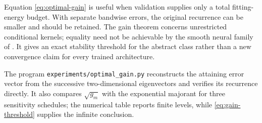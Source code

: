 Equation \eqref{eq:optimal-gain} is useful when validation supplies only a total fitting-energy budget. With separate bandwise errors, the original recurrence can be smaller and should be retained. The gain theorem concerns unrestricted conditional kernels; equality need not be achievable by the smooth neural family of . It gives an exact stability threshold for the abstract class rather than a new convergence claim for every trained architecture.

The program \texttt{experiments/optimal\_gain.py} reconstructs the attaining error vector from the successive two-dimensional eigenvectors and verifies its recurrence directly. It also compares $\sqrt{g_m}$ with the exponential majorant for three sensitivity schedules; the numerical table reports finite levels, while \eqref{eq:gain-threshold} supplies the infinite conclusion.
\begin{table}[htbp]
\centering\small

\caption{Exact aggregate-error gains for $L_j=0.5j^{-p}$. Each entry compares the optimal gain $\sqrt{g_m}$ with the sufficient exponential gain $\sqrt2\exp(\sum_{j=1}^mL_j^2)$. Only $p>1/2$ admits a bounded infinite-hierarchy gain.}\label{tab:optimal-gain}
\end{table}
